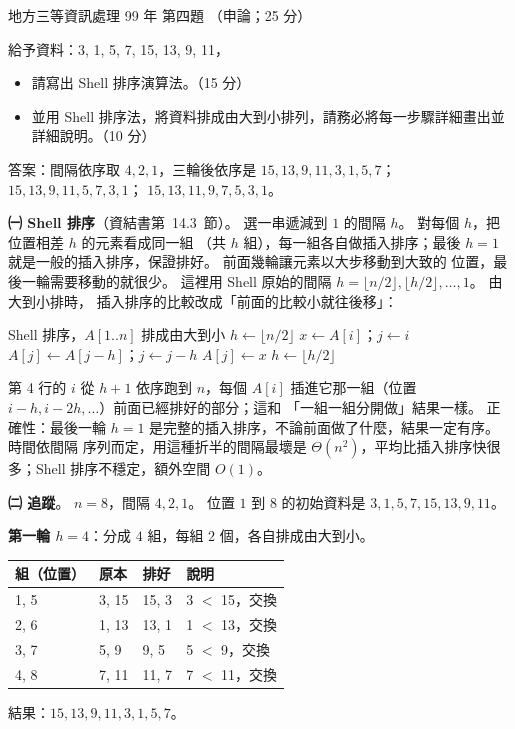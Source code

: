 \begin{pastexam}[label={px:df3-099-ds-04}]{地方三等資訊處理 99 年 第四題}
（申論；25 分）

給予資料：3, 1, 5, 7, 15, 13, 9, 11，
\begin{itemize}[leftmargin=2.2em]
\item[㈠] 請寫出 Shell 排序演算法。（15 分）
\item[㈡] 並用 Shell 排序法，將資料排成由大到小排列，請務必將每一步驟詳細畫出並詳細說明。（10 分）
\end{itemize}
\end{pastexam}

\begin{pastsoln}
答案：間隔依序取 $4, 2, 1$，三輪後依序是 $15, 13, 9, 11, 3, 1, 5, 7$；$15, 13, 9, 11, 5, 7, 3, 1$；
$15, 13, 11, 9, 7, 5, 3, 1$。

\textbf{㈠ Shell 排序}（資結書第~14.3~節）。 選一串遞減到 $1$ 的間隔 $h$。 對每個 $h$，把位置相差 $h$ 的元素看成同一組
（共 $h$ 組），每一組各自做插入排序；最後 $h = 1$ 就是一般的插入排序，保證排好。 前面幾輪讓元素以大步移動到大致的
位置，最後一輪需要移動的就很少。 這裡用 Shell 原始的間隔 $h = \lfloor n/2 \rfloor, \lfloor h/2 \rfloor, \ldots, 1$。 由大到小排時，
插入排序的比較改成「前面的比較小就往後移」：
\begin{pseudo}[unbreakable]{Shell 排序，$A[1..n]$ 排成由大到小}
    \State $h \gets \lfloor n/2 \rfloor$
         
            \State $x \gets A[i]$；$j \gets i$
             
                \State $A[j] \gets A[j - h]$；$j \gets j - h$
            \EndWhile
            \State $A[j] \gets x$
        \EndFor
        \State $h \gets \lfloor h/2 \rfloor$
    \EndWhile
\EndProcedure
\end{pseudo}
第 4 行的 $i$ 從 $h + 1$ 依序跑到 $n$，每個 $A[i]$ 插進它那一組（位置 $i - h, i - 2h, \ldots$）前面已經排好的部分；這和
「一組一組分開做」結果一樣。 正確性：最後一輪 $h = 1$ 是完整的插入排序，不論前面做了什麼，結果一定有序。 時間依間隔
序列而定，用這種折半的間隔最壞是 $\Theta(n^2)$，平均比插入排序快很多；Shell 排序不穩定，額外空間 $O(1)$。

\textbf{㈡ 追蹤}。 $n = 8$，間隔 $4, 2, 1$。 位置 $1$ 到 $8$ 的初始資料是 $3, 1, 5, 7, 15, 13, 9, 11$。

\textbf{第一輪 $h = 4$}：分成 $4$ 組，每組 $2$ 個，各自排成由大到小。
\begin{center}
\small
\begin{tabular}{llll}
\toprule
組（位置） & 原本 & 排好 & 說明 \\
\midrule
1, 5 & 3, 15 & 15, 3 & 3 $<$ 15，交換 \\
2, 6 & 1, 13 & 13, 1 & 1 $<$ 13，交換 \\
3, 7 & 5, 9 & 9, 5 & 5 $<$ 9，交換 \\
4, 8 & 7, 11 & 11, 7 & 7 $<$ 11，交換 \\
\bottomrule
\end{tabular}
\end{center}
結果：$15, 13, 9, 11, 3, 1, 5, 7$。


\end{pastsoln}
